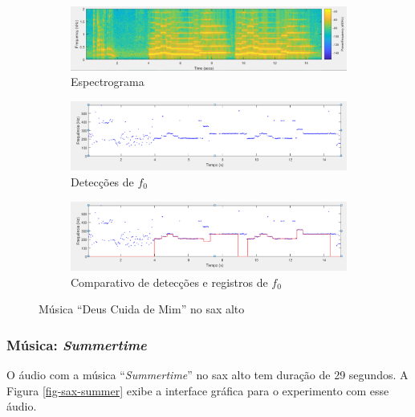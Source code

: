 \begin{figure}
	
	\begin{subfigure}{1\textwidth}
		\includegraphics[width=\linewidth]{pasta1_figuras/sax-Dcm-2.png}
		\caption{Espectrograma}
		\label{fig-sax-Dcm-2}
	\end{subfigure}
	\hspace*{\fill} %
	\begin{subfigure}{1\textwidth}
		\includegraphics[width=\linewidth]{pasta1_figuras/sax-Dcm-3.png}
		\caption{Detecções de $f_0$}
		\label{fig-sax-Dcm-3}
	\end{subfigure}
	\hspace*{\fill} %
	\begin{subfigure}{1\textwidth}
		\includegraphics[width=\linewidth]{pasta1_figuras/sax-Dcm-4.png}
		\caption{Comparativo de detecções e registros de $f_0$}
		\label{fig-sax-Dcm-4}
	\end{subfigure}
	\caption{Música ``Deus Cuida de Mim'' no sax alto}
\end{figure}

\subsubsection{Música: \textit{Summertime}}

O áudio com a música ``\textit{Summertime}'' no sax alto tem duração de 29 segundos. A Figura \ref{fig-sax-summer} exibe a interface gráfica para o experimento com esse áudio.

